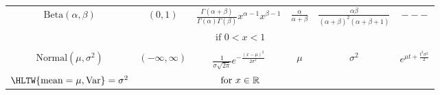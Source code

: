 \documentclass[12pt]{article}
\begin{document}
{\begin{center}
{{\begin{tabular}{|c|c|c|c|c|c|}
 $\text{Beta}(\alpha, \beta )$&$ (0, 1)$ & $   \frac{\Gamma(\alpha+\beta)}{\Gamma(\alpha)\Gamma(
 \beta)}x^{\alpha-1}x^{\beta-1}  $ & $\frac{\alpha}{\alpha+\beta}  $  & $ \frac{\alpha \beta}{ (\alpha+\beta)^2(\alpha+\beta+1)} $&   $ --- $\\
  & & $\text{ if } 0<x<1$ & & & \\
 \hline
 & & & & & \\
 $\text{Normal}(\mu, \sigma^2 )$&$ (-\infty , \infty )$ & $  \frac{1}{\sigma\sqrt{2\pi}}e^{-\frac{(x-\mu)^2}{2\sigma^2}} $ & $\mu  $  & $\sigma^2 $&   $  e^{\mu t +\frac{t^2\sigma^2}{2}}$\\
 $\HLTW{\text{mean}= \mu, \text{Var}}= \sigma^2$ & & $\text{ for  } x\in {\mathbb{ R}} $ & & & \\
 \hline
  \hline
\end{tabular}
}}\end{center}}
\end{document}
